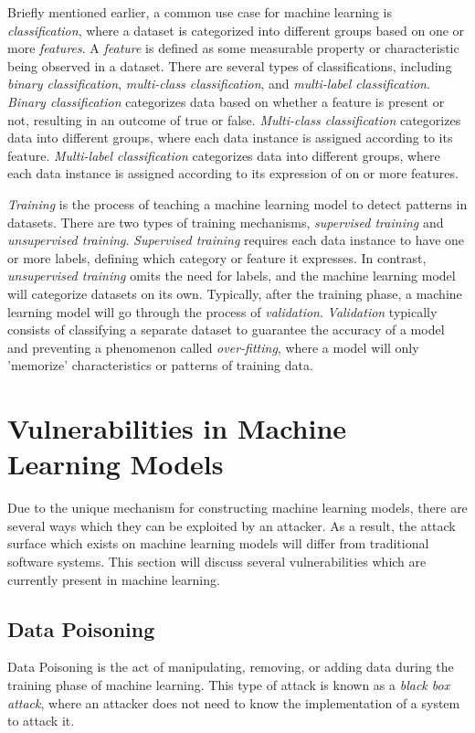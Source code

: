 \documentclass[11pt,conference]{IEEEtran}
\begin{document}
Briefly mentioned earlier, a common use case for machine learning is
\emph{classification}, where a dataset is categorized into different groups
based on one or more \emph{features}. A \emph{feature} is defined as some
measurable property or characteristic being observed in a dataset. There are several types of
classifications, including \emph{binary classification}, \emph{multi-class
classification}, and \emph{multi-label classification}. \emph{Binary
classification} categorizes data based on whether a feature is present or not,
resulting in an outcome of true or false. \emph{Multi-class classification}
categorizes data into different groups, where each data instance is assigned
according to its feature. \emph{Multi-label classification} categorizes data
into different groups, where each data instance is assigned according to its
expression of on or more features.

\emph{Training} is the process of teaching a machine learning model to detect patterns
in datasets. There are two types of training mechanisms, \emph{supervised
training} and \emph{unsupervised training}. \emph{Supervised training} requires
each data instance to have one or more labels, defining which category or
feature it expresses. In contrast, \emph{unsupervised training} omits the need
for labels, and the machine learning model will categorize datasets on its own.
Typically, after the training phase, a machine learning model will go through
the process of \emph{validation}. \emph{Validation} typically consists of
classifying a separate dataset to guarantee the accuracy of a model and
preventing a phenomenon called \emph{over-fitting}, where a model will only
'memorize' characteristics or patterns of training data.

\section{Vulnerabilities in Machine Learning Models}
Due to the unique mechanism for constructing machine learning models, there are
several ways which they can be exploited by an attacker. As a result, the
attack surface which exists on machine learning models will differ from
traditional software systems.
This section will discuss several vulnerabilities which are currently present
in machine learning.

\subsection{Data Poisoning}
Data Poisoning is the act of manipulating, removing, or adding
data during the training phase of machine learning. This type of attack is
known as a \emph{black box attack}, where an attacker does not need to know the
implementation of a system to attack it.
\end{document}
